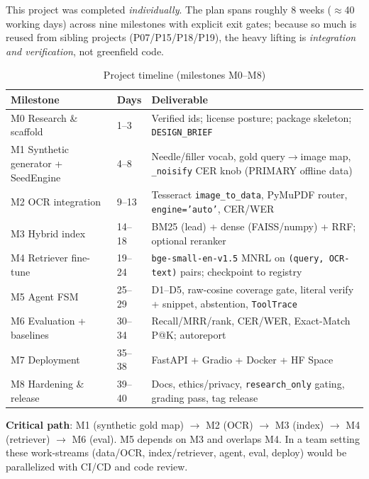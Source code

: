 \documentclass[12pt,a4paper]{article}
\begin{document}
This project was completed \textit{individually}. The plan spans roughly 8 weeks ($\approx$40 working days) across nine milestones with explicit exit gates; because so much is reused from sibling projects (P07/P15/P18/P19), the heavy lifting is \emph{integration and verification}, not greenfield code.

\begin{table}[H]
\centering
\caption{Project timeline (milestones M0--M8)}
\small
\begin{tabularx}{\linewidth}{@{} l l L @{}}
\toprule
\textbf{Milestone} & \textbf{Days} & \textbf{Deliverable} \\
\midrule
M0 Research \& scaffold & 1--3 & Verified ids; license posture; package skeleton; \texttt{DESIGN\_BRIEF} \\
M1 Synthetic generator + SeedEngine & 4--8 & Needle/filler vocab, gold query$\rightarrow$image map, \texttt{\_noisify} CER knob (PRIMARY offline data) \\
M2 OCR integration & 9--13 & Tesseract \texttt{image\_to\_data}, PyMuPDF router, \texttt{engine='auto'}, CER/WER \\
M3 Hybrid index & 14--18 & BM25 (lead) + dense (FAISS/numpy) + RRF; optional reranker \\
M4 Retriever fine-tune & 19--24 & \texttt{bge-small-en-v1.5} MNRL on \texttt{(query, OCR-text)} pairs; checkpoint to registry \\
M5 Agent FSM & 25--29 & D1--D5, raw-cosine coverage gate, literal verify + snippet, abstention, \texttt{ToolTrace} \\
M6 Evaluation + baselines & 30--34 & Recall/MRR/rank, CER/WER, Exact-Match P@K; autoreport \\
M7 Deployment & 35--38 & FastAPI + Gradio + Docker + HF Space \\
M8 Hardening \& release & 39--40 & Docs, ethics/privacy, \texttt{research\_only} gating, grading pass, tag release \\
\bottomrule
\end{tabularx}
\end{table}

\noindent\textbf{Critical path}: M1 (synthetic gold map) $\rightarrow$ M2 (OCR) $\rightarrow$ M3 (index) $\rightarrow$ M4 (retriever) $\rightarrow$ M6 (eval). M5 depends on M3 and overlaps M4. In a team setting these work-streams (data/OCR, index/retriever, agent, eval, deploy) would be parallelized with CI/CD and code review.

\end{document}
